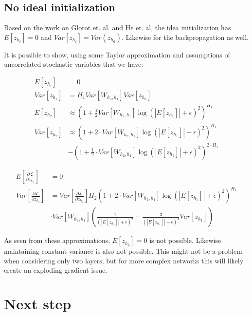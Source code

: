 \documentclass[a4paper]{article}
\begin{document}
\subsection{No ideal initialization}

Based on the work on Glorot et. al. and He et. al, the idea initialization has $E[z_{h_\ell}] = 0$ and $Var[z_{h_\ell}] = Var(z_{h_0})$. Likewise for the backpropagation as well.

It is possible to show, using some Taylor approximation and assumptions of uncorrelated stochastic variables that we have:

\begin{equation}
\begin{aligned}
E[z_{h_1}] &= 0 \\
Var[z_{h_1}] &= H_1 Var\left[W_{h_0, h_1}\right] Var[z_{h_0}]\\
E[z_{h_2}] &\approx\left(1 + \frac{1}{2} Var[W_{h_2, h_1}] \log(|E[z_{h_1}]| + \epsilon)^2\right)^{H_1} \\
Var[z_{h_2}] &\approx \left(1 + 2 \cdot Var[W_{h_2, h_1}] \log(|E[z_{h_1}]| + \epsilon)^2\right)^{H_1} \\
&- \left(1 + \frac{1}{2} \cdot Var[W_{h_2, h_1}] \log(|E[z_{h_1}]| + \epsilon)^2\right)^{2\cdot H_1}
\end{aligned}
\end{equation}

\begin{equation}
\begin{aligned}
E\left[\frac{\partial \mathcal{L}}{\partial z_{h_1}}\right] &= 0 \\
Var\left[\frac{\partial \mathcal{L}}{\partial z_{h_1}}\right] &= Var\left[\frac{\partial \mathcal{L}}{\partial z_{h_2}}\right] H_2 \left(1 + 2 \cdot Var[W_{h_2, h_1}] \log(|E[z_{h_1}]| + \epsilon)^2\right)^{H_1} \\
&\cdot Var[W_{h_2, h_1}] \left(\frac{1}{\left(|E[z_{h_1}]| + \epsilon\right)^2} + \frac{3}{\left(|E[z_{h_1}]| + \epsilon\right)^4} Var[z_{h_1}]\right)
\end{aligned}
\end{equation}

As seen from these approximations, $E[z_{h_2}] = 0$ is not possible. Likewise maintaining constant variance is also not possible. This might not be a problem when considering only two layers, but for more complex networks this will likely create an exploding gradient issue.

\section{Next step}
\end{document}
